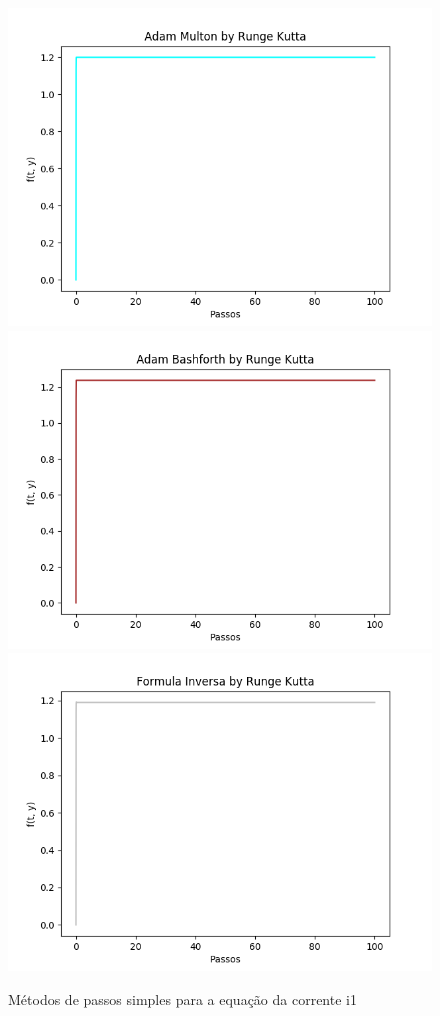\documentclass[12pt]{article}%
\begin{document}
    \begin{figure}[H]
        \begin{center}
            \includegraphics[width=.4\textwidth]{problemas/metodos_q2/circuito_multon.png}
            \includegraphics[width=.4\textwidth]{problemas/metodos_q2/circuito_bashforth.png}
            \includegraphics[width=.4\textwidth]{problemas/metodos_q2/circuito_inversa.png}
        \end{center}
        \caption{Métodos de passos simples para a equação da corrente i1}
    \end{figure}
\end{document}
